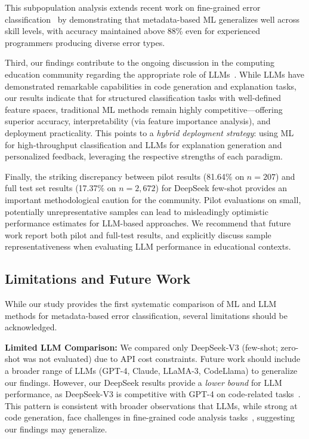 \documentclass[10pt,a4paper]{article}
\begin{document}
This subpopulation analysis extends recent work on fine-grained error
classification~\cite{altadmri2015most} by demonstrating that
metadata-based ML generalizes well across skill levels, with accuracy
maintained above 88\% even for experienced programmers producing diverse
error types.

Third, our findings contribute to the ongoing discussion in the computing
education community regarding the appropriate role of
LLMs~\cite{finnie2022robots,kazemitabaar2024impact}. While LLMs have
demonstrated remarkable capabilities in code generation and explanation tasks,
our results indicate that for structured classification tasks with
well-defined feature spaces, traditional ML methods remain highly
competitive---offering superior accuracy, interpretability (via feature
importance analysis), and deployment practicality. This points to a
\textit{hybrid deployment strategy}: using ML for high-throughput
classification and LLMs for explanation generation and personalized
feedback, leveraging the respective strengths of each paradigm.

Finally, the striking discrepancy between pilot results (81.64\% on $n=207$)
and full test set results (17.37\% on $n=2{,}672$) for DeepSeek few-shot
provides an important methodological caution for the community.
Pilot evaluations on small, potentially unrepresentative samples can
lead to misleadingly optimistic performance estimates for LLM-based
approaches. We recommend that future work report both pilot and full-test
results, and explicitly discuss sample representativeness when evaluating
LLM performance in educational contexts.

\subsection{Limitations and Future Work}

While our study provides the first systematic comparison of ML and LLM methods
for metadata-based error classification, several limitations should be
acknowledged.

\textbf{Limited LLM Comparison:} We compared only DeepSeek-V3 (few-shot;
zero-shot was not evaluated) due to API cost constraints. Future work should
include a broader range of LLMs (GPT-4, Claude, LLaMA-3, CodeLlama) to
generalize our findings. However, our DeepSeek results provide a \textit{lower
bound} for LLM performance, as DeepSeek-V3 is competitive with GPT-4 on
code-related tasks~\cite{deepseek2024technical}. This pattern is consistent with broader observations that LLMs, while
strong at code generation, face challenges in fine-grained code analysis
tasks~\cite{kazemitabaar2024impact,finnie2022robots}, suggesting our findings
may generalize.
\end{document}
